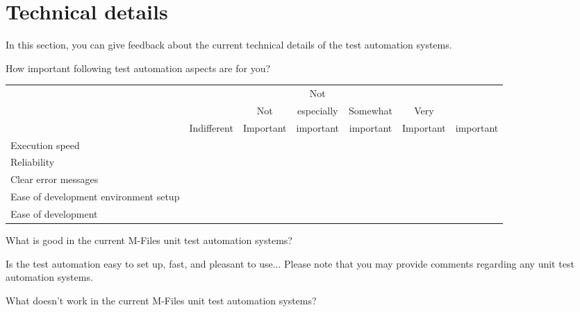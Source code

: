 \section*{Technical details}
In this section, you can give feedback about the current technical details of the test automation systems.

\begin{question}[resume]
	\item How important following test automation aspects are for you?\greencheckmark\label{survey_question:importance_of_test_automation_ascpects}
	\begin{center}
		\begin{tabularx}{\textwidth}{X c c c c c c}
			\rowcolor{rgb:white,1} &  &  & Not &  &  & \\
			\rowcolor{rgb:white,1} & & Not & especially & Somewhat & Very & \\
			\rowcolor{rgb:white,1} & Indifferent & Important & important & important & Important & important \\
			Execution speed & \radiobutton & \radiobutton & \radiobutton & \radiobutton & \radiobutton & \radiobutton\\
			Reliability & \radiobutton & \radiobutton & \radiobutton & \radiobutton & \radiobutton & \radiobutton\\
			Clear error messages & \radiobutton & \radiobutton & \radiobutton & \radiobutton & \radiobutton & \radiobutton\\
			Ease of development environment setup & \radiobutton & \radiobutton & \radiobutton & \radiobutton & \radiobutton & \radiobutton\\
			Ease of development & \radiobutton & \radiobutton & \radiobutton & \radiobutton & \radiobutton & \radiobutton\\
		\end{tabularx}
	\end{center}
	\item What is good in the current M-Files unit test automation systems?\greencheckmark\label{survey_question:good_in_unit_test_automation}\\
	\begin{surveydescription}
		Is the test automation easy to set up, fast, and pleasant to use... Please note that you may provide comments regarding any unit test automation systems.
	\end{surveydescription}
	\longtextfield
	\item What doesn't work in the current M-Files unit test automation systems?\greencheckmark\\

\end{question}
